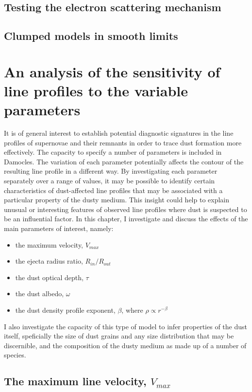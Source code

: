 \subsection{Testing the electron scattering mechanism}
\subsection{Clumped models in smooth limits}


\section{An analysis of the sensitivity of line profiles to the variable parameters}
It is of general interest to establish potential diagnostic signatures in 
the line profiles of supernovae and their remnants in order to trace dust 
formation more effectively. The capacity to specify a number of parameters is included in Damocles.  The variation of each parameter potentially affects the contour of the resulting line profile in a different way.  By investigating each parameter separately over a range of values, it may be possible to identify certain characteristics of dust-affected line profiles that may be associated with a particular property of the dusty medium.  This insight could help to explain unusual or interesting features of observed line profiles where dust is suspected to be an influential factor.  In this chapter, I investigate and discuss the effects of the main 
parameters of interest, namely:

\begin{itemize}
\item the maximum velocity, $V_{max}$
\item the ejecta radius ratio, $R_{in}/R_{out}$
\item the dust optical depth,  $\tau$
\item the dust albedo, $\omega$ 
\item the dust density profile exponent, $\beta$, where $\rho \propto r^{-\beta}$
\end{itemize}

I also investigate the capacity of this type of model to infer properties of the dust itself, speficially the size of dust grains and any size distribution that may be discernible, and the composition of the dusty medium as made up of a number of species. 


\subsection{The maximum line velocity, $V_{max}$}

